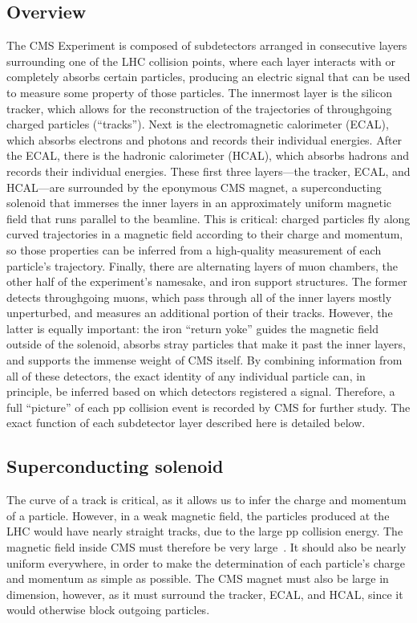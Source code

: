 \subsection{Overview}
The CMS Experiment is composed of subdetectors arranged in consecutive layers surrounding one of the LHC collision points, where each layer interacts with or completely absorbs certain particles, producing an electric signal that can be used to measure some property of those particles. 
The innermost layer is the silicon tracker, which allows for the reconstruction of the trajectories of throughgoing charged particles (``tracks''). 
Next is the electromagnetic calorimeter (ECAL), which absorbs electrons and photons and records their individual energies. 
After the ECAL, there is the hadronic calorimeter (HCAL), which absorbs hadrons and records their individual energies. 
These first three layers---the tracker, ECAL, and HCAL---are surrounded by the eponymous CMS magnet, a superconducting solenoid that immerses the inner layers in an approximately uniform magnetic field that runs parallel to the beamline. 
This is critical: charged particles fly along curved trajectories in a magnetic field according to their charge and momentum, so those properties can be inferred from a high-quality measurement of each particle's trajectory. 
Finally, there are alternating layers of muon chambers, the other half of the experiment's namesake, and iron support structures. 
The former detects throughgoing muons, which pass through all of the inner layers mostly unperturbed, and measures an additional portion of their tracks.
However, the latter is equally important: the iron ``return yoke'' guides the magnetic field outside of the solenoid, absorbs stray particles that make it past the inner layers, and supports the immense weight of CMS itself. 
By combining information from all of these detectors, the exact identity of any individual particle can, in principle, be inferred based on which detectors registered a signal. 
Therefore, a full ``picture'' of each pp collision event is recorded by CMS for further study. 
The exact function of each subdetector layer described here is detailed below.

\subsection{Superconducting solenoid}
The curve of a track is critical, as it allows us to infer the charge and momentum of a particle. 
However, in a weak magnetic field, the particles produced at the LHC would have nearly straight tracks, due to the large pp collision energy. 
The magnetic field inside CMS must therefore be very large~\cite{CMSWebMagnet}. 
It should also be nearly uniform everywhere, in order to make the determination of each particle's charge and momentum as simple as possible. 
The CMS magnet must also be large in dimension, however, as it must surround the tracker, ECAL, and HCAL, since it would otherwise block outgoing particles. 

